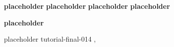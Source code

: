 \begin{bio}
  {\bfseries placeholder}
  {\bfseries placeholder}
  {\bfseries placeholder}
  {\bfseries placeholder}

  {\bfseries placeholder}

\end{bio}

\begin{tutorial}
  {placeholder}
  {tutorial-final-014}
  {\daydateyear, \tutorialmorningtime}
  {\TutLocA}


\end{tutorial}
